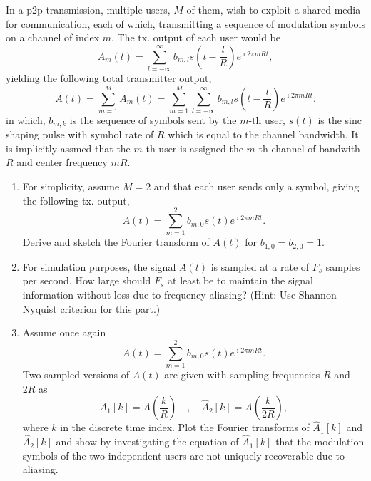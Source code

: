 \documentclass[10pt,letterpaper]{article}
\newcounter{QuestionNumber}
\newcommand{\Q}{
\textbf{Question \theQuestionNumber)}
\stepcounter{QuestionNumber}
}
\newcommand{\nl}{\newline\newline}
\begin{document}
In a p2p transmission, multiple users, $M$ of them, wish to exploit a shared media for communication, each of which, transmitting a sequence of modulation symbols on a channel of index $m$. The tx. output of each user would be
$$
A_m(t)=\sum_{l=-\infty}^\infty b_{m,l}s(t-\frac{l}{R})e^{\imath 2\pi mR t},
$$
yielding the following total transmitter output,
$$
A(t)=\sum_{m=1}^MA_m(t)=\sum_{m=1}^M\sum_{l=-\infty}^\infty b_{m,l}s(t-\frac{l}{R})e^{\imath 2\pi mR t}.
$$
in which, $b_{m,k}$ is the sequence of symbols sent by the $m$-th user, $s(t)$ is the sinc shaping pulse with symbol rate of $R$ which is equal to the channel bandwidth. It is implicitly assmed that the $m$-th user is assigned the $m$-th channel of bandwith $R$ and center frequency $mR$.
\begin{enumerate}[label=\alph*.]
\item
For simplicity, assume $M=2$ and that each user sends only a symbol, giving the following tx. output,
$$
A(t)=\sum_{m=1}^2 b_{m,0}s(t)e^{\imath 2\pi mR t}.
$$
Derive and sketch the Fourier transform of $A(t)$ for $b_{1,0}=b_{2,0}=1$.
\item
For simulation purposes, the signal $A(t)$ is sampled at a rate of $F_s$ samples per second. How large should $F_s$ at least be to maintain the signal information without loss due to frequency aliasing? (Hint: Use Shannon-Nyquist criterion for this part.)
\item
Assume once again
$$
A(t)=\sum_{m=1}^2 b_{m,0}s(t)e^{\imath 2\pi mR t}.
$$
Two sampled versions of $A(t)$ are given with sampling frequencies $R$ and $2R$ as
$$
\hat A_1[k]=A(\frac{k}{R})\quad,\quad \hat A_2[k]=A(\frac{k}{2R}),
$$
where $k$ in the discrete time index. Plot the Fourier transforms of $\hat A_1[k]$ and $\hat A_2[k]$ and show by investigating the equation of $\hat A_1[k]$ that the modulation symbols of the two independent users are not uniquely recoverable due to aliasing.
%
\end{enumerate}
%
%
\end{document}
